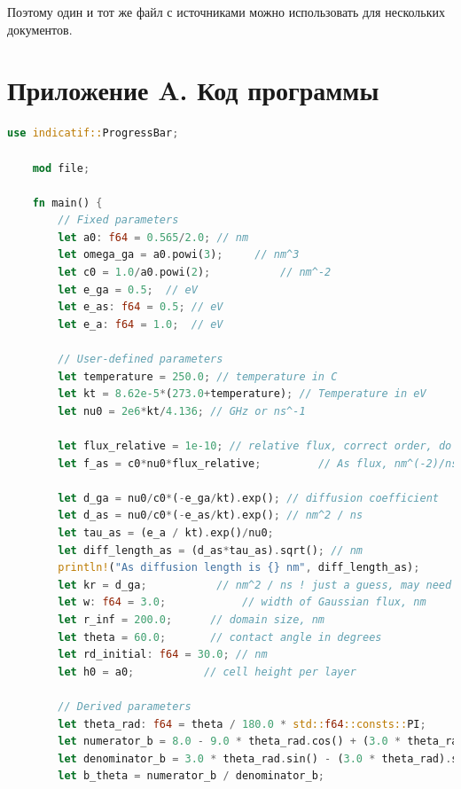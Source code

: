 \documentclass[14pt,oneside]{extarticle}
\begin{document}
Поэтому один и тот же файл с источниками можно использовать для нескольких документов.


\clearpage
{}
\printbibliography


\clearpage
\appendix

\section*{Приложение A. Код программы}

\begin{lstlisting}[language=Rust]
    use indicatif::ProgressBar;

    mod file;
    
    fn main() {
        // Fixed parameters
        let a0: f64 = 0.565/2.0; // nm
        let omega_ga = a0.powi(3);     // nm^3
        let c0 = 1.0/a0.powi(2);           // nm^-2
        let e_ga = 0.5;  // eV
        let e_as: f64 = 0.5; // eV
        let e_a: f64 = 1.0;  // eV
    
        // User-defined parameters
        let temperature = 250.0; // temperature in C
        let kt = 8.62e-5*(273.0+temperature); // Temperature in eV
        let nu0 = 2e6*kt/4.136; // GHz or ns^-1
    
        let flux_relative = 1e-10; // relative flux, correct order, do not change the order
        let f_as = c0*nu0*flux_relative;         // As flux, nm^(-2)/ns
    
        let d_ga = nu0/c0*(-e_ga/kt).exp(); // diffusion coefficient
        let d_as = nu0/c0*(-e_as/kt).exp(); // nm^2 / ns
        let tau_as = (e_a / kt).exp()/nu0;
        let diff_length_as = (d_as*tau_as).sqrt(); // nm
        println!("As diffusion length is {} nm", diff_length_as);
        let kr = d_ga;           // nm^2 / ns ! just a guess, may need to change
        let w: f64 = 3.0;            // width of Gaussian flux, nm
        let r_inf = 200.0;      // domain size, nm
        let theta = 60.0;       // contact angle in degrees
        let rd_initial: f64 = 30.0; // nm
        let h0 = a0;           // cell height per layer
    
        // Derived parameters
        let theta_rad: f64 = theta / 180.0 * std::f64::consts::PI;
        let numerator_b = 8.0 - 9.0 * theta_rad.cos() + (3.0 * theta_rad).cos();
        let denominator_b = 3.0 * theta_rad.sin() - (3.0 * theta_rad).sin();
        let b_theta = numerator_b / denominator_b;
    

\end{lstlisting}
\end{document}
